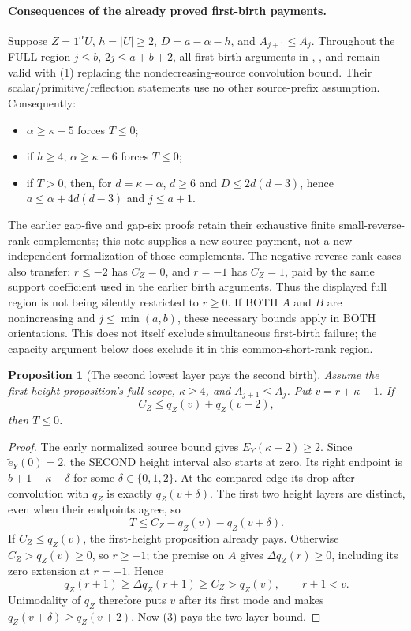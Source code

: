 \documentclass[11pt]{article}
\newtheorem{proposition}{Proposition}[section]
\begin{document}
\paragraph{Consequences of the already proved first-birth payments.}
Suppose $Z=1^\alpha U$, $h=|U|\ge2$, $D=a-\alpha-h$,
and $A_{j+1}\le A_j$. Throughout the FULL region
$j\le b$, $2j\le a+b+2$,
all first-birth arguments in {\normalfont{}},
{\normalfont{}}, and
{\normalfont{}} remain valid
with (1) replacing the nondecreasing-source convolution bound.
Their scalar/primitive/reflection statements use no other source-prefix
assumption. Consequently:
\begin{itemize}
\item $\alpha\ge\kappa-5$ forces $T\le0$;
\item if $h\ge4$, $\alpha\ge\kappa-6$ forces $T\le0$;
\item if $T>0$, then, for $d=\kappa-\alpha$,
      $d\ge6$ and $D\le2d(d-3)$, hence
      $a\le\alpha+4d(d-3)$ and $j\le a+1$.
\end{itemize}
The earlier gap-five and gap-six proofs retain their exhaustive finite
small-reverse-rank complements; this note supplies a new source payment,
not a new independent formalization of those complements.
The negative reverse-rank cases also transfer: $r\le-2$ has
$C_Z=0$, and $r=-1$ has $C_Z=1$, paid by the same support
coefficient used in the earlier birth arguments. Thus the displayed
full region is not being silently restricted to $r\ge0$.
If BOTH $A$ and $B$ are nonincreasing and $j\le\min(a,b)$, these
necessary bounds apply in BOTH orientations. This does not itself
exclude simultaneous first-birth failure; the capacity argument below
does exclude it in this common-short-rank region.

\begin{proposition}[The second lowest layer pays the second birth]
Assume the first-height proposition's full scope, $\kappa\ge4$,
and $A_{j+1}\le A_j$. Put $v=r+\kappa-1$. If
\[
                         C_Z\le q_Z(v)+q_Z(v+2),     \tag{3}
\]
then $T\le0$.
\end{proposition}
\begin{proof}
The early normalized source bound gives $E_Y(\kappa+2)\ge2$.
Since $\widetilde e_Y(0)=2$, the SECOND height interval also
starts at zero. Its right endpoint is $b+1-\kappa-\delta$
for some $\delta\in\{0,1,2\}$. At the compared edge its drop
after convolution with $q_Z$ is exactly $q_Z(v+\delta)$.
The first two height layers are distinct, even when their
endpoints agree, so
\[
                T\le C_Z-q_Z(v)-q_Z(v+\delta).
\]
If $C_Z\le q_Z(v)$, the first-height proposition already pays.
Otherwise $C_Z>q_Z(v)\ge0$, so $r\ge-1$; the premise on $A$
gives $\Delta q_Z(r)\ge0$, including its zero extension at $r=-1$.
Hence
\[
 q_Z(r+1)\ge\Delta q_Z(r+1)\ge C_Z>q_Z(v),
 \qquad r+1<v.
\]
Unimodality of $q_Z$ therefore puts $v$ after its first mode
and makes $q_Z(v+\delta)\ge q_Z(v+2)$.
Now (3) pays the two-layer bound.
\end{proof}
\end{document}
